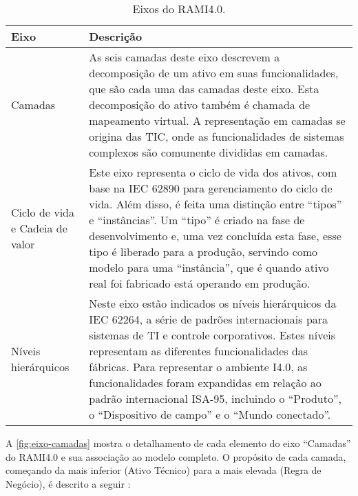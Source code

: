 \begin{table}[htb]
	\centering
	\footnotesize
	\caption{Eixos do RAMI4.0.}
	\label{tab:rami-eixos}
	\begin{tabular}{p{3cm}p{12cm}}
		\hline
		\textbf{Eixo} & \textbf{Descrição}                                                                                                                                                                                                                                                                                                                                                                                                  \\

		\hline
		Camadas
		              & As seis camadas deste eixo descrevem a decomposição de um ativo em suas funcionalidades, que são cada uma das camadas deste eixo. Esta decomposição do ativo também é chamada de mapeamento virtual. A representação em camadas se origina das TIC, onde as funcionalidades de sistemas complexos são comumente divididas em camadas.                                                                               \\

		\hline
		Ciclo de vida e Cadeia de valor
		              & Este eixo representa o ciclo de vida dos ativos, com base na IEC 62890 para gerenciamento do ciclo de vida. Além disso, é feita uma distinção entre ``tipos'' e ``instâncias''. Um ``tipo'' é criado na fase de desenvolvimento e, uma vez concluída esta fase, esse tipo é liberado para a produção, servindo como modelo para uma ``instância'', que é quando ativo real foi fabricado está operando em produção. \\

		\hline
		Níveis hierárquicos
		              & Neste eixo estão indicados os níveis hierárquicos da IEC 62264, a série de padrões internacionais para sistemas de TI e controle corporativos. Estes níveis representam as diferentes funcionalidades das fábricas. Para representar o ambiente I4.0, as funcionalidades foram expandidas em relação ao padrão internacional ISA-95, incluindo o ``Produto'', o ``Dispositivo de campo'' e o ``Mundo conectado''.   \\
		\hline
	\end{tabular}
\end{table}

A \autoref{fig:eixo-camadas} mostra o detalhamento de cada elemento do eixo ``Camadas'' do RAMI4.0 e sua associação ao modelo completo. O propósito de cada camada, começando da mais inferior (Ativo Técnico) para a mais elevada (Regra de Negócio), é descrito a seguir \cite{bitkom2016implementation}:

